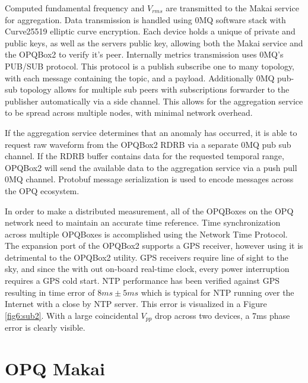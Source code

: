 Computed fundamental frequency and $V_{rms}$ are transmitted to the Makai service for aggregation. Data transmission is handled using 0MQ software stack with Curve25519 elliptic curve encryption. Each device holds a unique of private and public keys, as well as the servers public key, allowing both the Makai service and the OPQBox2 to verify it's peer. Internally metrics transmission uses 0MQ's PUB/SUB protocol. This protocol is a publish subscribe one to many topology, with each message containing the topic, and a payload. Additionally 0MQ pub-sub topology allows for multiple sub peers with subscriptions forwarder to the publisher automatically via a side channel. This allows for the aggregation service to be spread across multiple nodes, with minimal network overhead.

If the aggregation service determines that an anomaly has occurred, it is able to request raw waveform from the OPQBox2 RDRB via a separate 0MQ pub sub channel. If the RDRB buffer contains data for the requested temporal range, OPQBox2 will send the available data to the aggregation service via a push pull 0MQ channel. Protobuf message serialization is used to encode messages across the OPQ ecosystem. 

In order to make a distributed measurement, all of the OPQBoxes on the OPQ network need to maintain an accurate time reference. Time synchronization across multiple OPQBoxes is accomplished using the Network Time Protocol. The expansion port of the OPQBox2 supports a GPS receiver, however using it is detrimental to the OPQBox2 utility. GPS receivers require line of sight to the sky, and since the with out on-board real-time clock, every power interruption requires a GPS cold start. NTP performance has been verified against GPS resulting in time error of $8ms\pm 5ms$ which is typical for NTP running over the Internet with a close by NTP server. This error is visualized in a Figure \ref{fig6:sub2}. With a large coincidental $V_{pp}$ drop across two devices, a 7ms phase error is clearly visible.

\section{OPQ Makai}

